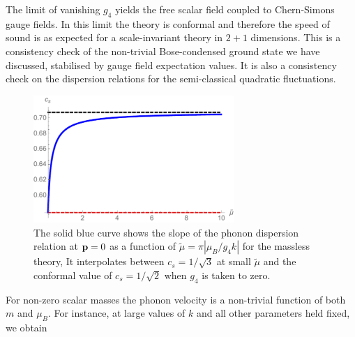 \eea
The limit of vanishing $g_4$ yields the free scalar field coupled to Chern-Simons gauge fields. In this limit the theory is conformal and therefore the speed of sound is as expected for a scale-invariant theory in $2+1$ dimensions. This is a consistency check of  the non-trivial Bose-condensed ground state we have discussed, stabilised by gauge field expectation values. It is also a consistency check on the dispersion relations for the semi-classical quadratic fluctuations.
\begin{figure}[h]
\begin{center}
\includegraphics[width=3in]{Chapter_3_Folder_1806.06976/figures/soundspeed.pdf}
\end{center}
    \caption[This figure shows the value of the speed of sound as a function of the dimensionless parameter $\tilde{\mu}= \pi \left|\frac{\mu_B}{g_4 k} \right|$ for the massless theory.]{ The solid blue curve shows the slope of the phonon dispersion relation at ${\bf p} =0$ as a function of $\tilde\mu = \pi|\mu_B/g_4 k|$ for the massless theory, It interpolates between $c_s=1/\sqrt{3}$ at small $\tilde\mu$ and the conformal value of $c_s = 1/\sqrt{2}$ when $g_4$ is taken to zero.
}
\end{figure}
For non-zero scalar masses the phonon velocity is a non-trivial function of both $m$ and $\mu_B$.  For instance, at large values of $k$ and all other parameters held fixed, we obtain
